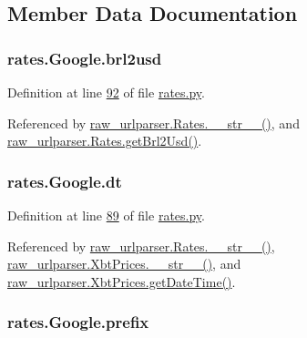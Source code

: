 \subsection{Member Data Documentation}
\subsubsection[{\texorpdfstring{brl2usd}{brl2usd}}]{\setlength{\rightskip}{0pt plus 5cm}rates.\+Google.\+brl2usd}\hypertarget{classrates_1_1_google_a0979ffcb18b8bf3156cc5735c67ca6df}{}\label{classrates_1_1_google_a0979ffcb18b8bf3156cc5735c67ca6df}


Definition at line \hyperlink{rates_8py_source_l00092}{92} of file \hyperlink{rates_8py_source}{rates.\+py}.



Referenced by \hyperlink{raw__urlparser_8py_source_l00038}{raw\+\_\+urlparser.\+Rates.\+\_\+\+\_\+str\+\_\+\+\_\+()}, and \hyperlink{raw__urlparser_8py_source_l00029}{raw\+\_\+urlparser.\+Rates.\+get\+Brl2\+Usd()}.

\subsubsection[{\texorpdfstring{dt}{dt}}]{\setlength{\rightskip}{0pt plus 5cm}rates.\+Google.\+dt}\hypertarget{classrates_1_1_google_a76574be36237f78780f76bed53e69ab2}{}\label{classrates_1_1_google_a76574be36237f78780f76bed53e69ab2}


Definition at line \hyperlink{rates_8py_source_l00089}{89} of file \hyperlink{rates_8py_source}{rates.\+py}.



Referenced by \hyperlink{raw__urlparser_8py_source_l00038}{raw\+\_\+urlparser.\+Rates.\+\_\+\+\_\+str\+\_\+\+\_\+()}, \hyperlink{raw__urlparser_8py_source_l00074}{raw\+\_\+urlparser.\+Xbt\+Prices.\+\_\+\+\_\+str\+\_\+\+\_\+()}, and \hyperlink{raw__urlparser_8py_source_l00059}{raw\+\_\+urlparser.\+Xbt\+Prices.\+get\+Date\+Time()}.

\subsubsection[{\texorpdfstring{prefix}{prefix}}]{\setlength{\rightskip}{0pt plus 5cm}rates.\+Google.\+prefix}\hypertarget{classrates_1_1_google_ada5de8700ad571d0ab819fa0163d6bbe}{}\label{classrates_1_1_google_ada5de8700ad571d0ab819fa0163d6bbe}


